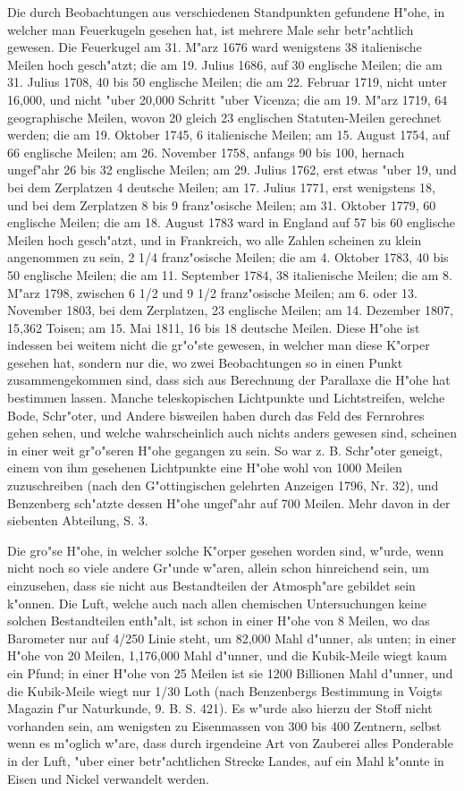 \documentclass[a4paper, 11pt, oneside, polutonikogreek, german]{article}
\begin{document}
Die durch Beobachtungen aus verschiedenen Standpunkten gefundene H"ohe, in welcher man Feuerkugeln gesehen hat, ist mehrere Male sehr betr"achtlich gewesen. Die Feuerkugel am 31. M"arz 1676 ward wenigstens 38 italienische Meilen hoch gesch"atzt; die am 19. Julius 1686, auf 30 englische Meilen; die am 31. Julius 1708, 40 bis 50 englische Meilen; die am 22. Februar 1719, nicht unter 16,000, und nicht "uber 20,000 Schritt "uber Vicenza; die am 19. M"arz 1719, 64 geographische Meilen, wovon 20 gleich 23 englischen Statuten-Meilen gerechnet werden; die am 19. Oktober 1745, 6 italienische Meilen; am 15. August 1754, auf 66 englische Meilen; am 26. November 1758, anfangs 90 bis 100, hernach ungef"ahr 26 bis 32 englische Meilen; am 29. Julius 1762, erst etwas "uber 19, und bei dem Zerplatzen 4 deutsche Meilen; am 17. Julius 1771, erst wenigstens 18, und bei dem Zerplatzen 8 bis 9 franz"osische Meilen; am 31. Oktober 1779, 60 englische Meilen; die am 18. August 1783 ward in England auf 57 bis 60 englische Meilen hoch gesch"atzt, und in Frankreich, wo alle Zahlen scheinen zu klein angenommen zu sein, 2 1/4 franz"osische Meilen; die am 4. Oktober 1783, 40 bis 50 englische Meilen; die am 11. September 1784, 38 italienische Meilen; die am 8. M"arz 1798, zwischen 6 1/2 und 9 1/2 franz"osische Meilen; am 6. oder 13. November 1803, bei dem Zerplatzen, 23 englische Meilen; am 14. Dezember 1807, 15,362 Toisen; am 15. Mai 1811, 16 bis 18 deutsche Meilen. Diese H"ohe ist indessen bei weitem nicht die gr"o"ste gewesen, in welcher man diese K"orper gesehen hat, sondern nur die, wo zwei Beobachtungen so in einen Punkt zusammengekommen sind, dass sich aus Berechnung der Parallaxe die H"ohe hat bestimmen lassen. Manche teleskopischen Lichtpunkte und Lichtstreifen, welche Bode, Schr"oter, und Andere bisweilen haben durch das Feld des Fernrohres gehen sehen, und welche wahrscheinlich auch nichts anders gewesen sind, scheinen in einer weit gr"o"seren H"ohe gegangen zu sein. So war z. B. Schr"oter geneigt, einem von ihm gesehenen Lichtpunkte eine H"ohe wohl von 1000 Meilen zuzuschreiben (nach den G"ottingischen gelehrten Anzeigen 1796, Nr. 32), und Benzenberg sch"atzte dessen H"ohe ungef"ahr auf 700 Meilen. Mehr davon in der siebenten Abteilung, S. 3.

Die gro"se H"ohe, in welcher solche K"orper gesehen worden sind, w"urde, wenn nicht noch so viele andere Gr"unde w"aren, allein schon hinreichend sein, um einzusehen, dass sie nicht aus Bestandteilen der Atmosph"are gebildet sein k"onnen. Die Luft, welche auch nach allen chemischen Untersuchungen keine solchen Bestandteilen enth"alt, ist schon in einer H"ohe von 8 Meilen, wo das Barometer nur auf 4/250 Linie steht, um 82,000 Mahl d"unner, als unten; in einer H"ohe von 20 Meilen, 1,176,000 Mahl d"unner, und die Kubik-Meile wiegt kaum ein Pfund; in einer H"ohe von 25 Meilen ist sie 1200 Billionen Mahl d"unner, und die Kubik-Meile wiegt nur 1/30 Loth (nach Benzenbergs Bestimmung in Voigts Magazin f"ur Naturkunde, 9. B. S. 421). Es w"urde also hierzu der Stoff nicht vorhanden sein, am wenigsten zu Eisenmassen von 300 bis 400 Zentnern, selbst wenn es m"oglich w"are, dass durch irgendeine Art von Zauberei alles Ponderable in der Luft, "uber einer betr"achtlichen Strecke Landes, auf ein Mahl k"onnte in Eisen und Nickel verwandelt werden.
\end{document}
